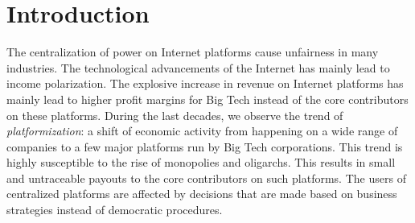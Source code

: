 \chapter{Introduction}
\label{introduction}
The centralization of power on Internet platforms cause unfairness in many industries. The technological advancements of the Internet has mainly lead to income polarization. The explosive increase in revenue on Internet platforms has mainly lead to higher profit margins for Big Tech instead of the core contributors on these platforms. During the last decades, we observe the trend of \textit{platformization}: a shift of economic activity from happening on a wide range of companies to a few major platforms run by Big Tech corporations. 
This trend is highly susceptible to the rise of monopolies and oligarchs.  This results in small and untraceable payouts to the core contributors on such platforms. The users of centralized platforms are affected by decisions that are made based on business strategies instead of democratic procedures.

